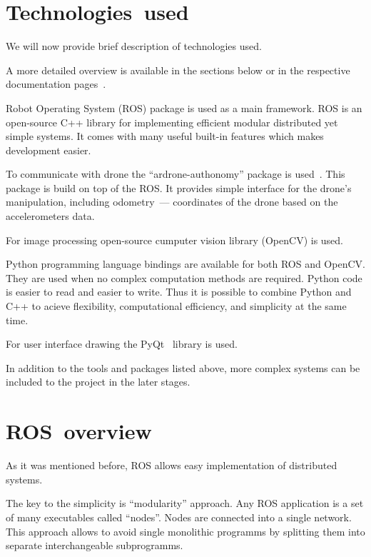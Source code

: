 \documentclass[11pt]{article}
\begin{document}
    \section{Technologies~used}

    We will now provide brief description of technologies used.
    
    A more detailed overview is available in the sections
    below or in the respective documentation pages~\cite{ROSsite, OpenCVsite}.

    Robot Operating System (ROS) package is used as a main framework.
    ROS is an open-source C++ library for implementing efficient modular
    distributed yet simple systems. It comes with many useful built-in
    features which makes development easier.

    To communicate with drone the ``ardrone-authonomy''
    package is used~\cite{ArdroneAuthonomy}.
    This package is build on top of the ROS. It provides simple interface for
    the drone's manipulation, including odometry~--- coordinates of the drone
    based on the accelerometers data.

    For image processing open-source cumputer vision library (OpenCV) is used.
    
    Python programming language bindings are available for both ROS
    and OpenCV. They are used when no complex computation methods are required.
    Python code is easier to read and easier to write.
    Thus it is possible to combine Python and C++ to acieve flexibility,
    computational efficiency, and simplicity at the same time.

    For user interface drawing the PyQt~\cite{PyQt} library is used.

    In addition to the tools and packages listed above,
    more complex systems can be included to the project in the later stages.

    \section{ROS~overview}

    As it was mentioned before, ROS allows easy implementation
    of distributed systems.

    The key to the simplicity is ``modularity'' approach.
    Any ROS application is a set of many executables called ``nodes''.
    Nodes are connected into a single network.
    This approach allows to avoid single monolithic programms
    by splitting them into separate interchangeable subprogramms.
\end{document}
